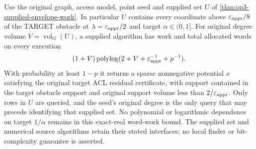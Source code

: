 \begin{theorem}
\label{thm:op3-alpha-independent-supplied-envelope}
Use the original graph, access model, point seed and supplied set $U$
of \cref{thm:op3-supplied-envelope-work}. In particular $U$ contains
every coordinate above $\varepsilon_{\mathrm{appr}}/8$ of the TARGET obstacle at
$\lambda=\varepsilon_{\mathrm{appr}}/2$ and target $\alpha\in(0,1]$.
For original degree volume $V=\operatorname{vol}_G(U)$, a supplied
algorithm has work and total allocated words on every execution
\[
 (1+V)\operatorname{polylog}(2+V+\varepsilon_{\mathrm{appr}}^{-1}+p^{-1}).
\]
With probability at least $1-p$ it returns a sparse nonnegative potential
$x$ satisfying the original target ACL residual certificate, with
support contained in the target obstacle support and original support
volume less than $2/\varepsilon_{\mathrm{appr}}$. Only rows in $U$ are queried, and the
seed's original degree is the only query that may precede identifying
that supplied set. No polynomial or logarithmic dependence on target
$1/\alpha$ remains in this exact-real word-work bound. The supplied
set and numerical source algorithms retain their stated interfaces;
no local finder or bit-complexity guarantee is asserted.
\end{theorem}
